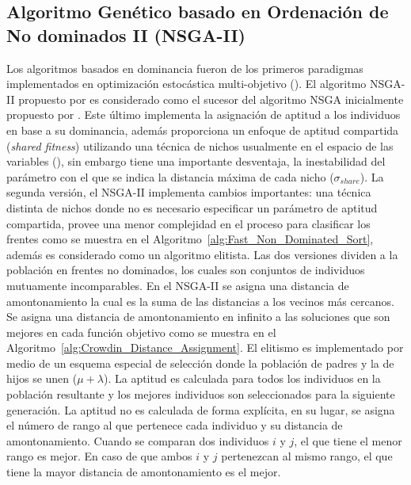 
\subsection{Algoritmo Genético basado en Ordenación de No dominados II (NSGA-II)}

Los algoritmos basados en dominancia fueron de los primeros paradigmas implementados en optimización estocástica multi-objetivo (\cite{Joel:MOEA_APPLICATIONS_BOOK_KCTAN}).
%
El algoritmo NSGA-II propuesto por \cite{Joel:NSGAII} es considerado como el sucesor del algoritmo NSGA inicialmente propuesto por \cite{Joel:NSGA}.
%
Este último implementa la asignación de aptitud a los individuos en base a su dominancia, además proporciona un enfoque de aptitud compartida (\textit{shared fitness}) utilizando una técnica de nichos usualmente en el espacio de las variables (\cite{Joel:Kalyanmoy}), sin embargo tiene una importante desventaja, la inestabilidad del parámetro con el que se indica la distancia máxima de cada nicho ($\sigma_{share}$).
%
La segunda versión, el NSGA-II implementa cambios importantes: una técnica distinta de nichos donde no es necesario especificar un parámetro de aptitud compartida, provee una menor complejidad en el proceso para clasificar los frentes como se muestra en el Algoritmo~\ref{alg:Fast_Non_Dominated_Sort}, además es considerado como un algoritmo elitista.
%
Las dos versiones dividen a la población en frentes no dominados, los cuales son conjuntos de individuos mutuamente incomparables.
%
En el NSGA-II se asigna una distancia de amontonamiento la cual es la suma de las distancias a los vecinos más cercanos. 
%
Se asigna una distancia de amontonamiento en infinito a las soluciones que son mejores en cada función objetivo como se muestra en el Algoritmo~\ref{alg:Crowdin_Distance_Assignment}.
%
El elitismo es implementado por medio de un esquema especial de selección donde la población de padres y la de hijos se unen ($\mu + \lambda$). 
%
La aptitud es calculada para todos los individuos en la población resultante y los mejores individuos son seleccionados para la siguiente generación.
%
La aptitud no es calculada de forma explícita, en su lugar, se asigna el número de rango al que pertenece cada individuo y su distancia de amontonamiento.
%
Cuando se comparan dos individuos $i$ y $j$, el que tiene el menor rango es mejor.
%
En caso de que ambos $i$ y $j$ pertenezcan al mismo rango, el que tiene la mayor distancia de amontonamiento es el mejor. 
%


